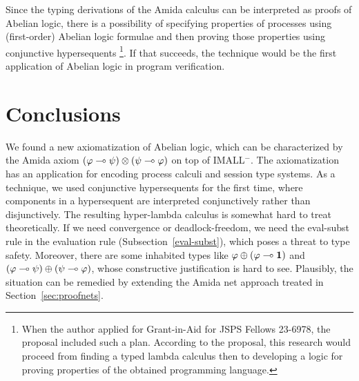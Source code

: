 Since the typing derivations of the Amida calculus can be interpreted as
proofs of Abelian logic, there is a possibility of specifying properties
of processes using (first-order) Abelian logic formulae and then
proving those properties using conjunctive hypersequents%
\footnote{When the author applied for Grant-in-Aid for JSPS Fellows
23-6978, the proposal included such a plan.  According to the proposal,
this research would proceed from finding a typed lambda calculus then to
developing a logic for proving properties of the obtained programming
language.}.
If that succeeds, the technique would be the first application of
Abelian logic in program verification.

\section{Conclusions}

We found a new axiomatization of Abelian logic, which can be
characterized by the Amida axiom
$(\varphi\multimap\psi)\otimes(\psi\multimap\varphi)$ on top of IMALL$^-$.
The axiomatization has an application for encoding process calculi and
session type systems.
As a technique, we used conjunctive hypersequents for the first time,
where components in a hypersequent are interpreted conjunctively rather
than disjunctively.
The resulting hyper-lambda calculus is somewhat hard to treat
theoretically.
If we need convergence or deadlock-freedom, we need the eval-subst rule in the evaluation rule
(Subsection~\ref{eval-subst}),
which poses a threat to type safety.
Moreover, there are some inhabited types like $\varphi\oplus
(\varphi\multimap\mathbf{1})$ and $(\varphi\multimap\psi)\oplus(\psi\multimap\varphi)$,
whose constructive justification is hard to see.
Plausibly, the situation can be remedied by extending the Amida net
approach treated in Section~\ref{sec:proofnets}.
